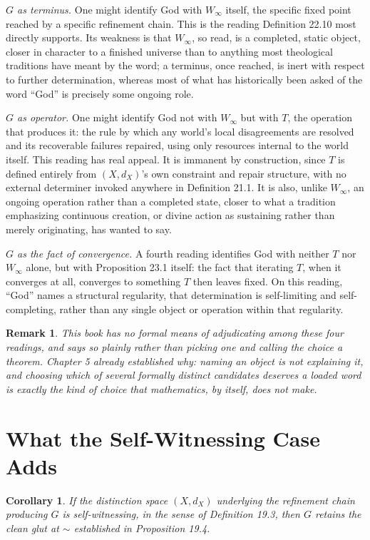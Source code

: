 \documentclass[11pt]{book}
\newtheorem{corollary}[theorem]{Corollary}
\newtheorem{remark}[theorem]{Remark}
\begin{document}
\emph{$G$ as terminus.} One might identify God with $W_\infty$ itself, the specific fixed point reached by a specific refinement chain. This is the reading Definition 22.10 most directly supports. Its weakness is that $W_\infty$, so read, is a completed, static object, closer in character to a finished universe than to anything most theological traditions have meant by the word; a terminus, once reached, is inert with respect to further determination, whereas most of what has historically been asked of the word ``God'' is precisely some ongoing role.

\emph{$G$ as operator.} One might identify God not with $W_\infty$ but with $T$, the operation that produces it: the rule by which any world's local disagreements are resolved and its recoverable failures repaired, using only resources internal to the world itself. This reading has real appeal. It is immanent by construction, since $T$ is defined entirely from $(X, d_X)$'s own constraint and repair structure, with no external determiner invoked anywhere in Definition 21.1. It is also, unlike $W_\infty$, an ongoing operation rather than a completed state, closer to what a tradition emphasizing continuous creation, or divine action as sustaining rather than merely originating, has wanted to say.

\emph{$G$ as the fact of convergence.} A fourth reading identifies God with neither $T$ nor $W_\infty$ alone, but with Proposition 23.1 itself: the fact that iterating $T$, when it converges at all, converges to something $T$ then leaves fixed. On this reading, ``God'' names a structural regularity, that determination is self-limiting and self-completing, rather than any single object or operation within that regularity.

\begin{remark}
This book has no formal means of adjudicating among these four readings, and says so plainly rather than picking one and calling the choice a theorem. Chapter 5 already established why: naming an object is not explaining it, and choosing which of several formally distinct candidates deserves a loaded word is exactly the kind of choice that mathematics, by itself, does not make.
\end{remark}

\section{What the Self-Witnessing Case Adds}

\begin{corollary}
If the distinction space $(X, d_X)$ underlying the refinement chain producing $G$ is self-witnessing, in the sense of Definition 19.3, then $G$ retains the clean glut at $\sim$ established in Proposition 19.4.
\end{corollary}
\end{document}
